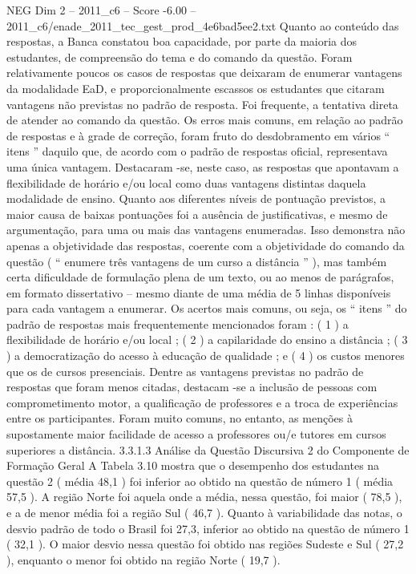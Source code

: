 \begin{textsample}{NEG Dim 2 – 2011\_c6 – Score -6.00 – 2011\_c6/enade\_2011\_tec\_gest\_prod\_4e6bad5ee2.txt}
Quanto ao conteúdo das respostas, a Banca constatou boa capacidade, por parte da maioria dos estudantes, de compreensão do tema e do comando da questão.
Foram relativamente poucos os casos de respostas que deixaram de enumerar vantagens da modalidade EaD, e proporcionalmente escassos os estudantes que citaram vantagens não previstas no padrão de resposta.
Foi frequente, a tentativa direta de atender ao comando da questão.
Os erros mais comuns, em relação ao padrão de respostas e à grade de correção, foram fruto do desdobramento em vários “ itens ” daquilo que, de acordo com o padrão de respostas oficial, representava uma única vantagem.
Destacaram -se, neste caso, as respostas que apontavam a flexibilidade de horário e/ou local como duas vantagens distintas daquela modalidade de ensino.
Quanto aos diferentes níveis de pontuação previstos, a maior causa de baixas pontuações foi a ausência de justificativas, e mesmo de argumentação, para uma ou mais das vantagens enumeradas.
Isso demonstra não apenas a objetividade das respostas, coerente com a objetividade do comando da questão ( “ enumere três vantagens de um curso a distância ” ), mas também certa dificuldade de formulação plena de um texto, ou ao menos de parágrafos, em formato dissertativo – mesmo diante de uma média de 5 linhas disponíveis para cada vantagem a enumerar.
Os acertos mais comuns, ou seja, os “ itens ” do padrão de respostas mais frequentemente mencionados foram : ( 1 ) a flexibilidade de horário e/ou local ; ( 2 ) a capilaridade do ensino a distância ; ( 3 ) a democratização do acesso à educação de qualidade ; e ( 4 ) os custos menores que os de cursos presenciais.
Dentre as vantagens previstas no padrão de respostas que foram menos citadas, destacam -se a inclusão de pessoas com comprometimento motor, a qualificação de professores e a troca de experiências entre os participantes.
Foram muito comuns, no entanto, as menções à supostamente maior facilidade de acesso a professores ou/e tutores em cursos superiores a distância. 3.3.1.3 Análise da Questão Discursiva 2 do Componente de Formação Geral A Tabela 3.10 mostra que o desempenho dos estudantes na questão 2 ( média 48,1 ) foi inferior ao obtido na questão de número 1 ( média 57,5 ).
A região Norte foi aquela onde a média, nessa questão, foi maior ( 78,5 ), e a de menor média foi a região Sul ( 46,7 ).
Quanto à variabilidade das notas, o desvio padrão de todo o Brasil foi 27,3, inferior ao obtido na questão de número 1 ( 32,1 ).
O maior desvio nessa questão foi obtido nas regiões Sudeste e Sul ( 27,2 ), enquanto o menor foi obtido na região Norte ( 19,7 ).

\end{textsample}

